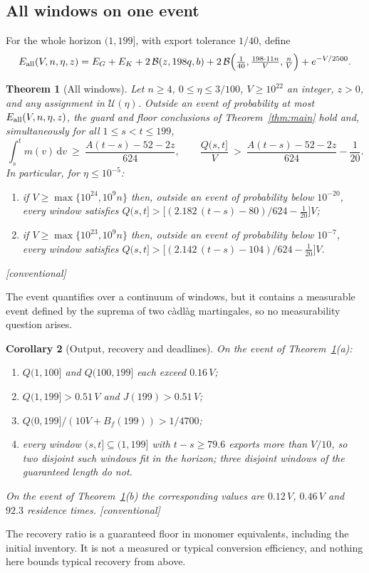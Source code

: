 \documentclass[11pt,letterpaper]{article}
\theoremstyle{plain}
\newtheorem{theorem}{Theorem}[section]
\newtheorem{corollary}[theorem]{Corollary}
\theoremstyle{definition}
\theoremstyle{remark}
\numberwithin{equation}{section}
\newcommand{\cB}{\mathcal B}
\newcommand{\cU}{\mathcal U}
\newcommand{\dd}{\,\mathrm d}
\newcommand{\evid}[1]{{\normalfont\small\textsf{[}#1\textsf{]}}}
\begin{document}
\subsection{All windows on one event}
For the whole horizon $(1,199]$, with export tolerance $1/40$, define
\begin{equation}\label{eq:Eall}
 E_{\rm all}(V,n,\eta,z)=E_G+E_K+2\,\cB(z,198q,b)+2\,\cB\Bigl(\tfrac1{40},\tfrac{198\cdot11n}V,\tfrac nV\Bigr)+e^{-V/2500}.
\end{equation}

\begin{theorem}[All windows]\label{thm:allwindows}
Let $n\ge4$, $0\le\eta\le3/100$, $V\ge10^{22}$ an integer, $z>0$, and any assignment in $\cU(\eta)$. Outside an event of probability at most $E_{\rm all}(V,n,\eta,z)$, the guard and floor conclusions of Theorem~\ref{thm:main} hold and, simultaneously for all $1\le s<t\le199$,
\begin{equation}\label{eq:allwindows}
 \int_s^tm(v)\dd v\ \ge\ \frac{A(t-s)-52-2z}{624},\qquad \frac{Q(s,t]}V\ >\ \frac{A(t-s)-52-2z}{624}-\frac1{20}.
\end{equation}
In particular, for $\eta\le10^{-5}$:
\begin{enumerate}[label=(\alph*)]
\item if $V\ge\max\{10^{24},10^9n\}$ then, outside an event of probability below $10^{-20}$, every window satisfies $Q(s,t]>\bigl[(2.182\,(t-s)-80)/624-\tfrac1{20}\bigr]V$;
\item if $V\ge\max\{10^{23},10^9n\}$ then, outside an event of probability below $10^{-7}$, every window satisfies $Q(s,t]>\bigl[(2.142\,(t-s)-104)/624-\tfrac1{20}\bigr]V$.
\end{enumerate}
\evid{conventional}
\end{theorem}
The event quantifies over a continuum of windows, but it contains a measurable event defined by the suprema of two c\`adl\`ag martingales, so no measurability question arises.

\begin{corollary}[Output, recovery and deadlines]\label{cor:output}
On the event of Theorem~\ref{thm:allwindows}\textup{(a)}:
\begin{enumerate}[label=(\alph*)]
\item $Q(1,100]$ and $Q(100,199]$ each exceed $0.16\,V$;
\item $Q(1,199]>0.51\,V$ and $J(199)>0.51\,V$;
\item $Q(0,199]/(10V+B_f(199))>1/4700$;
\item every window $(s,t]\subseteq(1,199]$ with $t-s\ge79.6$ exports more than $V/10$, so two disjoint such windows fit in the horizon; three disjoint windows of the guaranteed length do not.
\end{enumerate}
On the event of Theorem~\ref{thm:allwindows}\textup{(b)} the corresponding values are $0.12\,V$, $0.46\,V$ and $92.3$ residence times. \evid{conventional}
\end{corollary}
The recovery ratio is a guaranteed floor in monomer equivalents, including the initial inventory. It is not a measured or typical conversion efficiency, and nothing here bounds typical recovery from above.
\end{document}
